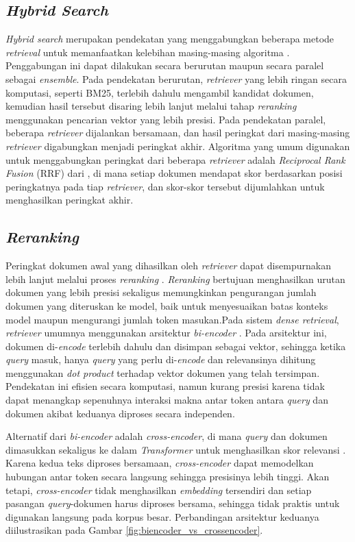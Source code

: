 \subsection{\textit{Hybrid Search}}
\textit{Hybrid search} merupakan pendekatan yang menggabungkan beberapa metode \textit{retrieval} untuk memanfaatkan kelebihan masing-masing algoritma \parencite{huyenAIEngineeringBuilding2025}. Penggabungan ini dapat dilakukan secara berurutan maupun secara paralel sebagai \textit{ensemble}. Pada pendekatan berurutan, \textit{retriever} yang lebih ringan secara komputasi, seperti BM25, terlebih dahulu mengambil kandidat dokumen, kemudian hasil tersebut disaring lebih lanjut melalui tahap \textit{reranking} menggunakan pencarian vektor yang lebih presisi. Pada pendekatan paralel, beberapa \textit{retriever} dijalankan bersamaan, dan hasil peringkat dari masing-masing \textit{retriever} digabungkan menjadi peringkat akhir. Algoritma yang umum digunakan untuk menggabungkan peringkat dari beberapa \textit{retriever} adalah \textit{Reciprocal Rank Fusion} (RRF) dari \textcite{cormackReciprocalRankFusion2009}, di mana setiap dokumen mendapat skor berdasarkan posisi peringkatnya pada tiap \textit{retriever}, dan skor-skor tersebut dijumlahkan untuk menghasilkan peringkat akhir.

\subsection{\textit{Reranking}}
Peringkat dokumen awal yang dihasilkan oleh \textit{retriever} dapat disempurnakan lebih lanjut melalui proses \textit{reranking} \parencite{huyenAIEngineeringBuilding2025}. \textit{Reranking} bertujuan menghasilkan urutan dokumen yang lebih presisi sekaligus memungkinkan pengurangan jumlah dokumen yang diteruskan ke model, baik untuk menyesuaikan batas konteks model maupun mengurangi jumlah token masukan.Pada sistem \textit{dense retrieval}, \textit{retriever} umumnya menggunakan arsitektur \textit{bi-encoder} \parencite{jm3}. Pada arsitektur ini, dokumen di-\textit{encode} terlebih dahulu dan disimpan sebagai vektor, sehingga ketika \textit{query} masuk, hanya \textit{query} yang perlu di-\textit{encode} dan relevansinya dihitung menggunakan \textit{dot product} terhadap vektor dokumen yang telah tersimpan. Pendekatan ini efisien secara komputasi, namun kurang presisi karena tidak dapat menangkap sepenuhnya interaksi makna antar token antara \textit{query} dan dokumen akibat keduanya diproses secara independen.

Alternatif dari \textit{bi-encoder} adalah \textit{cross-encoder}, di mana \textit{query} dan dokumen dimasukkan sekaligus ke dalam \textit{Transformer} untuk menghasilkan skor relevansi \parencite{reimersSentenceBERTSentenceEmbeddings2019}. Karena kedua teks diproses bersamaan, \textit{cross-encoder} dapat memodelkan hubungan antar token secara langsung sehingga presisinya lebih tinggi. Akan tetapi, \textit{cross-encoder} tidak menghasilkan \textit{embedding} tersendiri dan setiap pasangan \textit{query}-dokumen harus diproses bersama, sehingga tidak praktis untuk digunakan langsung pada korpus besar. Perbandingan arsitektur keduanya diilustrasikan pada Gambar \ref{fig:biencoder_vs_crossencoder}.

